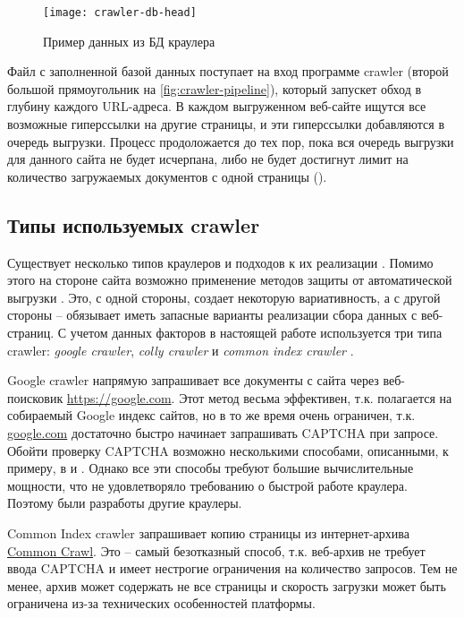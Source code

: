 \begin{figure}[h]
    \centering
    \texttt{[image: crawler-db-head]}
    \caption{Пример данных из БД краулера}
    \label{fig:crawler-db-head}
\end{figure}
Файл с заполненной базой данных поступает на вход программе \gls{crawler} (второй большой прямоугольник на \ref{fig:crawler-pipeline}), который запускет обход в глубину каждого URL-адреса.
В каждом выгруженном веб-сайте ищутся все возможные гиперссылки на другие страницы, и эти гиперссылки добавляются в очередь выгрузки.
Процесс продоложается до тех пор, пока вся очередь выгрузки для данного сайта не будет исчерпана, либо не будет достигнут лимит на количество загружаемых документов с одной страницы (\crawlerPageLimit).
\subsection{Типы используемых \gls{crawler}}
Существует несколько типов краулеров и подходов к их реализации \cite{cite:crawler-review}.
Помимо этого на стороне сайта возможно применение методов защиты от автоматической выгрузки \cite{cite:crawler-protection}.
Это, с одной стороны, создает некоторую вариативность, а с другой стороны -- обязывает иметь запасные варианты реализации сбора данных с веб-страниц.
С учетом данных факторов в настоящей работе используется три типа \gls{crawler}: \textit{google crawler}, \textit{colly crawler} \cite{cite:colly} и \textit{common index crawler} \cite{cite:common-crawl}.

Google \gls{crawler} напрямую запрашивает все документы с сайта через веб-поисковик \url{https://google.com}.
Этот метод весьма эффективен, т.к. полагается на собираемый Google индекс сайтов, но в то же время очень ограничен, т.к. \url{google.com} достаточно быстро начинает запрашивать CAPTCHA при запросе.
Обойти проверку CAPTCHA возможно несколькими способами, описанными, к примеру, в \cite{cite:captcha-bypass-1} и \cite{cite:captcha-bypass-2}.
Однако все эти способы требуют большие вычислительные мощности, что не удовлетворяло требованию о быстрой работе краулера.
Поэтому были разработы другие краулеры.

Common Index \gls{crawler} запрашивает копию страницы из интернет-архива \href{https://commoncrawl.org/}{Common Crawl}.
Это -- самый безотказный способ, т.к. веб-архив не требует ввода CAPTCHA и имеет нестрогие ограничения на количество запросов.
Тем не менее, архив может содержать не все страницы и скорость загрузки может быть ограничена из-за технических особенностей платформы.

